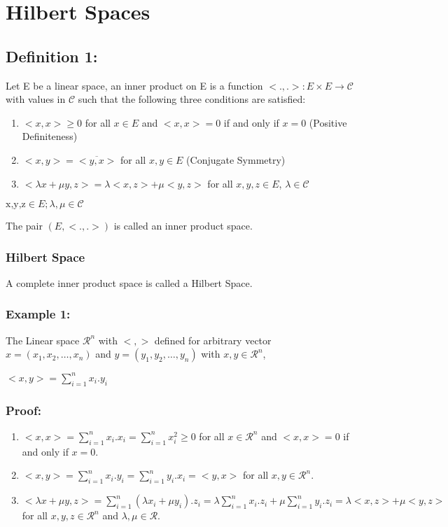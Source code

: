\documentclass[12pt]{article}
\begin{document}
\section{Hilbert Spaces}
\subsection*{Definition 1:} Let E be a linear space, an inner product on E is a function 
\begin{math}
    <.,.>: E \times E \to \mathcal{C}
\end{math} with values in $\mathcal{C}$ such that the following three conditions are satisfied:
\begin{enumerate}
    \item $<x,x> \geq 0$ for all $x \in E$ and $<x,x> = 0$ if and only if $x = 0$ (Positive Definiteness)
    \item $<x,y> = \overline{<y,x>}$ for all $x,y \in E$ (Conjugate Symmetry)
    \item $< \lambda x + \mu y, z> = \lambda <x,z> + \mu <y,z>$ for all $x,y,z \in E$, $\lambda \in \mathcal{C}$
\end{enumerate}
$\text{x,y,z} \in E; \lambda, \mu \in \mathcal{C}$

The pair $(E,<.,.>)$ is called an inner product space.

\subsubsection*{Hilbert Space}
A complete inner product space is called a Hilbert Space.

\subsubsection*{Example 1:}
The Linear space $ \mathcal{R}^n$ with $<,>$ defined for arbitrary vector $x = (x_1, x_2, \dots, x_n)$ and $y = (y_1, y_2, \dots, y_n)$ with $x,y \in \mathcal{R}^n$,

\begin{math}
    <x,y> = \sum_{i = 1}^{n} x_i.y_i
\end{math}

\subsubsection*{Proof:}
\begin{enumerate}
    \item $<x,x> = \sum_{i = 1}^{n} x_i.x_i = \sum_{i = 1}^{n} x_i^2 \geq 0$ for all $x \in \mathcal{R}^n$ and $<x,x> = 0$ if and only if $x = 0$.
    \item $<x,y> = \sum_{i = 1}^{n} x_i.y_i = \sum_{i = 1}^{n} y_i.x_i = <y,x>$ for all $x,y \in \mathcal{R}^n$.
    \item $< \lambda x + \mu y, z> = \sum_{i = 1}^{n} (\lambda x_i + \mu y_i).z_i = \lambda \sum_{i = 1}^{n} x_i.z_i + \mu \sum_{i = 1}^{n} y_i.z_i = \lambda <x,z> + \mu <y,z>$ for all $x,y,z \in \mathcal{R}^n$ and $\lambda, \mu \in \mathcal{R}$.
\end{enumerate}
\end{document}
